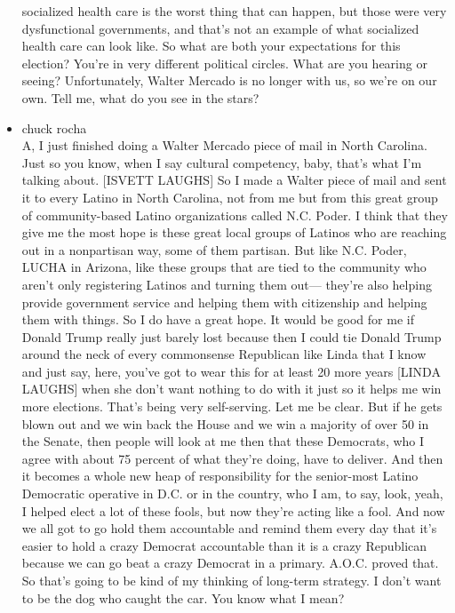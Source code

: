 \begin{itemize}
  socialized health care is the worst thing that can happen, but those
  were very dysfunctional governments, and that's not an example of what
  socialized health care can look like. So what are both your
  expectations for this election? You're in very different political
  circles. What are you hearing or seeing? Unfortunately, Walter Mercado
  is no longer with us, so we're on our own. Tell me, what do you see in
  the stars?
\item
  chuck rocha\\
  A, I just finished doing a Walter Mercado piece of mail in North
  Carolina. Just so you know, when I say cultural competency, baby,
  that's what I'm talking about. {[}ISVETT LAUGHS{]} So I made a Walter
  piece of mail and sent it to every Latino in North Carolina, not from
  me but from this great group of community-based Latino organizations
  called N.C. Poder. I think that they give me the most hope is these
  great local groups of Latinos who are reaching out in a nonpartisan
  way, some of them partisan. But like N.C. Poder, LUCHA in Arizona,
  like these groups that are tied to the community who aren't only
  registering Latinos and turning them out--- they're also helping
  provide government service and helping them with citizenship and
  helping them with things. So I do have a great hope. It would be good
  for me if Donald Trump really just barely lost because then I could
  tie Donald Trump around the neck of every commonsense Republican like
  Linda that I know and just say, here, you've got to wear this for at
  least 20 more years {[}LINDA LAUGHS{]} when she don't want nothing to
  do with it just so it helps me win more elections. That's being very
  self-serving. Let me be clear. But if he gets blown out and we win
  back the House and we win a majority of over 50 in the Senate, then
  people will look at me then that these Democrats, who I agree with
  about 75 percent of what they're doing, have to deliver. And then it
  becomes a whole new heap of responsibility for the senior-most Latino
  Democratic operative in D.C. or in the country, who I am, to say,
  look, yeah, I helped elect a lot of these fools, but now they're
  acting like a fool. And now we all got to go hold them accountable and
  remind them every day that it's easier to hold a crazy Democrat
  accountable than it is a crazy Republican because we can go beat a
  crazy Democrat in a primary. A.O.C. proved that. So that's going to be
  kind of my thinking of long-term strategy. I don't want to be the dog
  who caught the car. You know what I mean?

\end{itemize}
